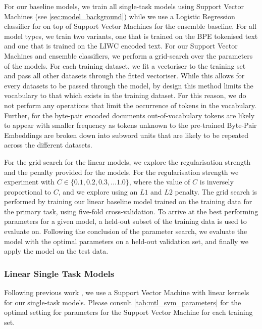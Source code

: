For our baseline models, we train all single-task models using Support Vector Machines (see \autoref{sec:model_background}) while we use a Logistic Regression classifier for on top of Support Vector Machines for the ensemble baseline. For all model types, we train two variants, one that is trained on the BPE tokenised text and one that is trained on the LIWC encoded text. For our Support Vector Machines and ensemble classifiers, we perform a grid-search over the parameters of the models. For each training dataset, we fit a vectoriser to the training set and pass all other datasets through the fitted vectoriser. While this allows for every datasets to be passed through the model, by design this method limits the vocabulary to that which exists in the training dataset. For this reason, we do not perform any operations that limit the occurrence of tokens in the vocabulary. Further, for the byte-pair encoded documents out-of-vocabulary tokens are likely to appear with smaller frequency as tokens unknown to the pre-trained Byte-Pair Embeddings are broken down into subword units that are likely to be repeated across the different datasets.

For the grid search for the linear models, we explore the regularisation strength and the penalty provided for the models. For the regularisation strength we experiment with $C\in \{0.1, 0.2, 0.3, \ldots 1.0\}$, where the value of $C$ is inversely proportional to $C$, and we explore using an $L1$ and $L2$ penalty. The grid search is performed by training our linear baseline model trained on the training data for the primary task, using five-fold cross-validation. To arrive at the best performing parameters for a given model, a held-out subset of the training data is used to evaluate on. Following the conclusion of the parameter search, we evaluate the model with the optimal parameters on a held-out validation set, and finally we apply the model on the test data.

\subsubsection{Linear Single Task Models}

Following previous work \cite{Waseem:2016,Davidson:2017}, we use a Support Vector Machine with linear kernels for our single-task models. Please consult \autoref{tab:mtl_svm_parameters} for the optimal setting for parameters for the Support Vector Machine for each training set.

